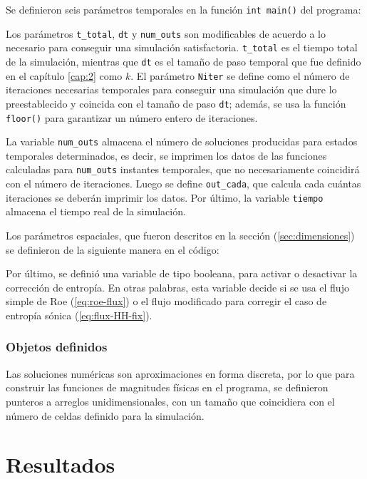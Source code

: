 

Se definieron seis parámetros temporales en la función \texttt{int main()} del programa:


Los parámetros \texttt{t\_total}, \texttt{dt} y \texttt{num\_outs} son modificables de acuerdo a lo necesario para conseguir una simulación satisfactoria. \texttt{t\_total} es el tiempo total de la simulación, mientras que \texttt{dt} es el tamaño de paso temporal que fue definido en el capítulo \ref{cap:2} como $k$. El parámetro \texttt{Niter} se define como el número de iteraciones necesarias temporales para conseguir una simulación que dure lo preestablecido y coincida con el tamaño de paso \texttt{dt}; además, se usa la función \texttt{floor()} para garantizar un número entero de iteraciones. 

La variable \texttt{num\_outs} almacena el número de soluciones producidas para estados temporales determinados, es decir, se imprimen los datos de las funciones calculadas para \texttt{num\_outs} instantes temporales, que no necesariamente coincidirá con el número de iteraciones. Luego se define \texttt{out\_cada}, que calcula cada cuántas iteraciones se deberán imprimir los datos. Por último, la variable \texttt{tiempo} almacena el tiempo real de la simulación.

Los parámetros espaciales, que fueron descritos en la sección (\ref{sec:dimensiones}) se definieron de la siguiente manera en el código:


Por último, se definió una variable de tipo booleana, para activar o desactivar la corrección de entropía. En otras palabras, esta variable decide si se usa el flujo simple de Roe (\ref{eq:roe-flux}) o el flujo modificado para corregir el caso de entropía sónica (\ref{eq:flux-HH-fix}).

\subsubsection{Objetos definidos}
Las soluciones numéricas son aproximaciones en forma discreta, por lo que para construir las funciones de magnitudes físicas en el programa, se definieron punteros a arreglos unidimensionales, con un tamaño que coincidiera con el número de celdas definido para la simulación.
\section{Resultados}
